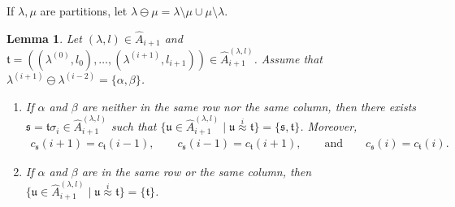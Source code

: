 \documentclass[11pt,a4paper,reqno,svgnames]{amsart}
\theoremstyle{plain}
\newtheorem{lemma}[theorem]{Lemma}
\theoremstyle{definition}
\numberwithin{equation}{section}
\begin{document}
If $\lambda,\mu$ are partitions, let $\lambda\ominus\mu=\lambda\setminus \mu\cup\mu\setminus\lambda$.
\begin{lemma}\label{involutions}
Let $(\lambda,l)\in\hat{A}_{i+1}$ and $\mathfrak{t}=((\lambda^{(0)},l_0),\ldots,(\lambda^{(i+1)},l_{i+1}))\in\hat{A}_{i+1}^{(\lambda,l)}$. Assume that $\lambda^{(i+1)}\ominus\lambda^{(i-2)}=\lbrace \alpha,\beta\rbrace$.  
\begin{enumerate}[label=(\arabic{*}), ref=\arabic{*},leftmargin=0pt,itemindent=1.5em]
\item\label{involutions:1} If $\alpha$ and $\beta$ are neither in the same row nor the same column, then there exists $\mathfrak{s}= \mathfrak{t}\sigma_{i}\in\hat{A}_{i+1}^{(\lambda,l)}$ such that $\lbrace \mathfrak{u}\in\hat{A}_{i+1}^{(\lambda,l)}\mid \mathfrak{u}\stackrel{i}{\approx}\mathfrak{t}\rbrace =\lbrace \mathfrak{s},\mathfrak{t}\}$. Moreover,  
\begin{align*}
c_\mathfrak{s}(i+1)=c_\mathfrak{t}(i-1),\qquad c_\mathfrak{s}(i-1)=c_\mathfrak{t}(i+1),\qquad\text{and}\qquad c_\mathfrak{s}(i)=c_\mathfrak{t}(i).
\end{align*}
\item\label{involutions:2} If $\alpha$ and $\beta$ are in the same row or the same column, then $\lbrace \mathfrak{u}\in\hat{A}_{i+1}^{(\lambda,l)}\mid \mathfrak{u}\stackrel{i}{\approx}\mathfrak{t}\rbrace =\lbrace \mathfrak{t}\}$. 
\end{enumerate}
\end{lemma}
\end{document}
